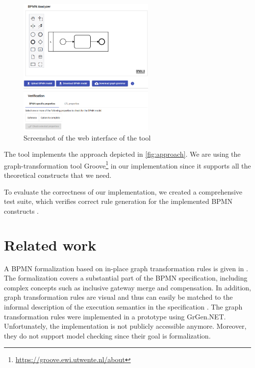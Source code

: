 \documentclass[adraft, copyright, creativecommons]{eptcs} %
\begin{document}
\begin{figure}[h]
    \centering
    \includegraphics[width=0.6\textwidth]{images/impl.png}
    \caption{Screenshot of the web interface of the tool}
    \label{fig:implScreenshot}
\end{figure}

The tool implements the approach depicted in \cref{fig:approach}.
We are using the graph-transformation tool Groove\footnote{\url{https://groove.ewi.utwente.nl/about}} in our implementation \cite{ghamarianModellingAnalysisUsing2012} since it supports all the theoretical constructs that we need.

To evaluate the correctness of our implementation, we created a comprehensive test suite, which verifies correct rule generation for the implemented BPMN constructs \cite{timkrauterArtifactsTERMGRAPH2022}.

\section{Related work} \label{sec:relatedWork}
A BPMN formalization based on in-place graph transformation rules is given in \cite{vangorpVisualTokenbasedFormalization2013}.
The formalization covers a substantial part of the BPMN specification, including complex concepts such as inclusive gateway merge and compensation.
In addition, graph transformation rules are visual and thus can easily be matched to the informal description of the execution semantics in the specification \cite{objectmanagementgroupBusinessProcessModel2013}.
The graph transformation rules were implemented in a prototype using GrGen.NET.
Unfortunately, the implementation is not publicly accessible anymore.
Moreover, they do not support model checking since their goal is formalization.
\end{document}
